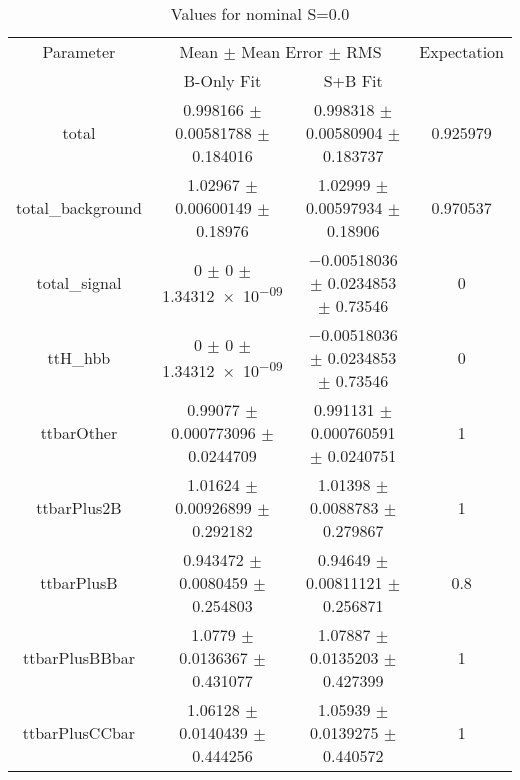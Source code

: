 \begin{table}
\centering
\caption{Values for nominal S=0.0}
\begin{tabular}{cccc}
\toprule
Parameter & \multicolumn{2}{c}{Mean $\pm$ Mean Error $\pm$ RMS} & Expectation\\
 & B-Only Fit & S+B Fit & \\
\midrule
total & \num{0.998166} $\pm$ \num{0.00581788} $\pm$ \num{0.184016} & \num{0.998318} $\pm$ \num{0.00580904} $\pm$ \num{0.183737} & \num{0.925979}\\
total\_background & \num{1.02967} $\pm$ \num{0.00600149} $\pm$ \num{0.18976} & \num{1.02999} $\pm$ \num{0.00597934} $\pm$ \num{0.18906} & \num{0.970537}\\
total\_signal & \num{0} $\pm$ \num{0} $\pm$ \num{1.34312e-09} & \num{-0.00518036} $\pm$ \num{0.0234853} $\pm$ \num{0.73546} & \num{0}\\
ttH\_hbb & \num{0} $\pm$ \num{0} $\pm$ \num{1.34312e-09} & \num{-0.00518036} $\pm$ \num{0.0234853} $\pm$ \num{0.73546} & \num{0}\\
ttbarOther & \num{0.99077} $\pm$ \num{0.000773096} $\pm$ \num{0.0244709} & \num{0.991131} $\pm$ \num{0.000760591} $\pm$ \num{0.0240751} & \num{1}\\
ttbarPlus2B & \num{1.01624} $\pm$ \num{0.00926899} $\pm$ \num{0.292182} & \num{1.01398} $\pm$ \num{0.0088783} $\pm$ \num{0.279867} & \num{1}\\
ttbarPlusB & \num{0.943472} $\pm$ \num{0.0080459} $\pm$ \num{0.254803} & \num{0.94649} $\pm$ \num{0.00811121} $\pm$ \num{0.256871} & \num{0.8}\\
ttbarPlusBBbar & \num{1.0779} $\pm$ \num{0.0136367} $\pm$ \num{0.431077} & \num{1.07887} $\pm$ \num{0.0135203} $\pm$ \num{0.427399} & \num{1}\\
ttbarPlusCCbar & \num{1.06128} $\pm$ \num{0.0140439} $\pm$ \num{0.444256} & \num{1.05939} $\pm$ \num{0.0139275} $\pm$ \num{0.440572} & \num{1}\\
\bottomrule
\end{tabular}
\end{table}
